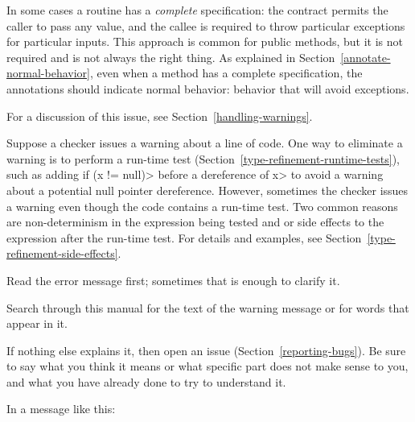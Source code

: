 In some cases a routine has a \emph{complete} specification:  the contract
permits the caller to pass any value, and the callee is required to throw
particular exceptions for particular inputs.  This approach is common for
public methods, but it is not required and is not always the right thing.
As explained in Section~\ref{annotate-normal-behavior}, even when a method
has a complete specification, the annotations should indicate normal
behavior:  behavior that will avoid exceptions.





For a discussion of this issue, see Section~\ref{handling-warnings}.



Suppose a checker issues a warning about a line of code.  One way to
eliminate a warning is to perform a run-time test
(Section~\ref{type-refinement-runtime-tests}), such as adding \<if (x !=
null)> before a dereference of \<x> to avoid a warning about a potential
null pointer dereference.  However, sometimes the checker issues a warning
even though the code contains a run-time test.  Two common reasons are
non-determinism in the expression being tested and or side effects to the
expression after the run-time test.  For details and examples, see
Section~\ref{type-refinement-side-effects}.



Read the error message first; sometimes that is enough to clarify it.

Search through this manual for the text of the warning message or for words
that appear in it.

If nothing else explains it, then
open an issue (Section~\ref{reporting-bugs}).
Be sure to say what you think it means or what specific part does
not make sense to you, and what you have already done to try to understand it.



In a message like this:


